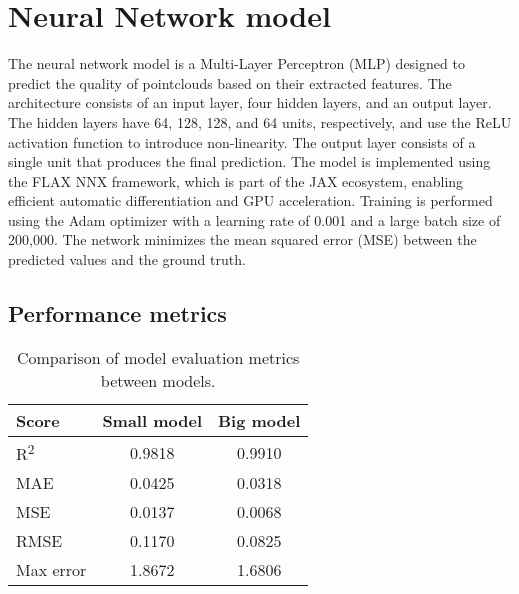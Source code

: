 \section{Neural Network model}
The neural network model is a Multi-Layer Perceptron (MLP) designed to predict the quality of pointclouds based on their extracted features. The architecture consists of an input layer, four hidden layers, and an output layer. The hidden layers have 64, 128, 128, and 64 units, respectively, and use the ReLU activation function to introduce non-linearity. The output layer consists of a single unit that produces the final prediction. The model is implemented using the FLAX NNX framework, which is part of the JAX ecosystem, enabling efficient automatic differentiation and GPU acceleration. Training is performed using the Adam optimizer with a learning rate of 0.001 and a large batch size of 200,000. The network minimizes the mean squared error (MSE) between the predicted values and the ground truth.




\subsection{Performance metrics}
\begin{table}[htbp]
\centering
\begin{tabular}{|l|c|c|}
\hline
\textbf{Score} & \textbf{Small model} & \textbf{Big model} \\
\hline
R\textsuperscript{2} & 0.9818 & 0.9910 \\
MAE & 0.0425 & 0.0318 \\
MSE & 0.0137 & 0.0068 \\
RMSE & 0.1170 & 0.0825 \\
Max error & 1.8672 & 1.6806 \\
\hline
\end{tabular}
\vspace{0.5em}  %
\caption{Comparison of model evaluation metrics between models.}
\label{tab:model_metrics}
\end{table}